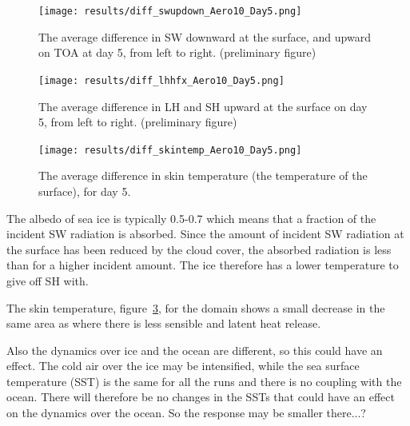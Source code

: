 \begin{figure}[h!]
\centering
\texttt{[image: results/diff\_swupdown\_Aero10\_Day5.png]}
\caption{The average difference in SW downward at the surface, and upward on TOA at day 5, from left to right. (preliminary figure)}
\label{fig:swup_down_r3Day5}
\end{figure}

\begin{figure}[h!]
\centering
\texttt{[image: results/diff\_lhhfx\_Aero10\_Day5.png]}
\caption{The average difference in LH and SH upward at the surface on day 5, from left to right. (preliminary figure)}
\label{fig:lhhfx_r3Day5}
\end{figure}

\begin{figure}[h!]
\centering
\texttt{[image: results/diff\_skintemp\_Aero10\_Day5.png]}
\caption{The average difference in skin temperature (the temperature of the surface), for day 5.}
\label{fig:skintemp_r3Day5}
\end{figure}
The albedo of sea ice is typically 0.5-0.7 which means that a fraction of the incident SW radiation is absorbed. Since the amount of incident SW radiation at the surface has been reduced by the cloud cover, the absorbed radiation is less than for a higher incident amount. The ice therefore has a lower temperature to give off SH with. 

The skin temperature, figure~\ref{fig:skintemp_r3Day5}, for the domain shows a small decrease in the same area as where there is less sensible and latent heat release.

Also the dynamics over ice and the ocean are different, so this could have an effect. The cold air over the ice may be intensified, while the sea surface temperature (SST) is the same for all the runs and there is no coupling with the ocean. There will therefore be no changes in the SSTs that could have an effect on the dynamics over the ocean. So the response may be smaller there...?








